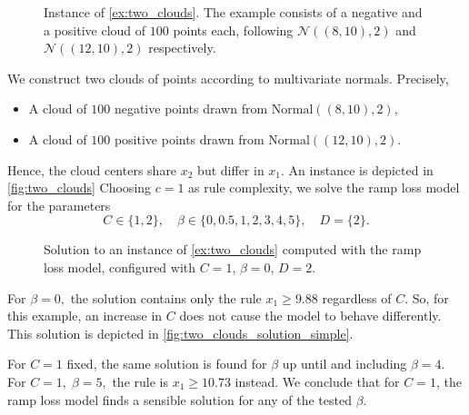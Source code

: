 \begin{example}\label{ex:two_clouds}
    \begin{figure}
        
        \caption{Instance of \autoref{ex:two_clouds}. The example consists of a negative and a positive cloud of $100$ points each, following $\mathcal{N}((8, 10), 2)$ and $\mathcal{N}((12, 10), 2)$ respectively.}
        \label{fig:two_clouds}
    \end{figure}
    We construct two clouds of points according to multivariate normals.
    Precisely,
    \begin{itemize}
        \item A cloud of $100$ negative points drawn from $\text{Normal}((8, 10), 2)$,
        \item A cloud of $100$ positive points drawn from $\text{Normal}((12, 10), 2)$.
    \end{itemize}
    Hence, the cloud centers share $x_2$ but differ in $x_1$.
    An instance is depicted in \autoref{fig:two_clouds}
    Choosing $c=1$ as rule complexity, we solve the ramp loss model for the parameters
    \[C \in \{1,2\}, \quad \beta \in \{0, 0.5, 1, 2, 3, 4, 5\}, \quad D = \{2\}.\]

    \begin{figure}
        
        \caption{Solution to an instance of \autoref{ex:two_clouds} computed with the ramp loss model, configured with $C=1$, $\beta=0$, $D=2$.}
        \label{fig:two_clouds_solution_simple}
    \end{figure}
    For $\beta=0,$ the solution contains only the rule
    $x_1 \geq 9.88$ regardless of $C$.
    So, for this example, an increase in $C$ does not cause the model to behave differently.
    This solution is depicted in \autoref{fig:two_clouds_solution_simple}.

    For $C=1$ fixed, the same solution is found for $\beta$ up until and including $\beta = 4$.
    For $C=1, \; \beta=5,$ the rule is $x_1 \geq 10.73$ instead.
    We conclude that for $C=1$, the ramp loss model finds a sensible solution for any of the tested $\beta$.


\end{example}
